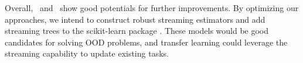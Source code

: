 Overall, \SDT~and \SDF~show good potentials for further improvements. By optimizing our approaches, we intend to construct robust streaming estimators and add streaming trees to the scikit-learn package \citep{scikit-learn}. These models would be good candidates for solving OOD problems, and transfer learning could leverage the streaming capability to update existing tasks.